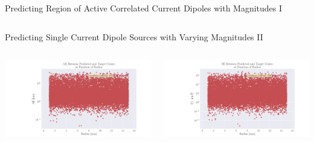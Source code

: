 \documentclass[aspectratio=169, 9pt]{beamer}
\begin{document}
\begin{frame}{Predicting Region of Active Correlated Current Dipoles with Magnitudes I}
\begin{itemize}
\begin{table}[]
\begin{tabular}{|ccc|l|ccc|l|ccc|}
      \end{tabular}
\end{table}
\end{itemize}
\end{frame}


\begin{frame}{Predicting Single Current Dipole Sources with Varying Magnitudes II}
  \begin{columns}
    \begin{column}{0.5\textwidth}
      \includegraphics[width=7cm]{figures/mae_area.pdf}
    \end{column}
    \begin{column}{0.5\textwidth}
      \includegraphics[width=7cm]{figures/mse_area.pdf}
    \end{column}
  \end{columns}
\end{frame}
\end{document}
